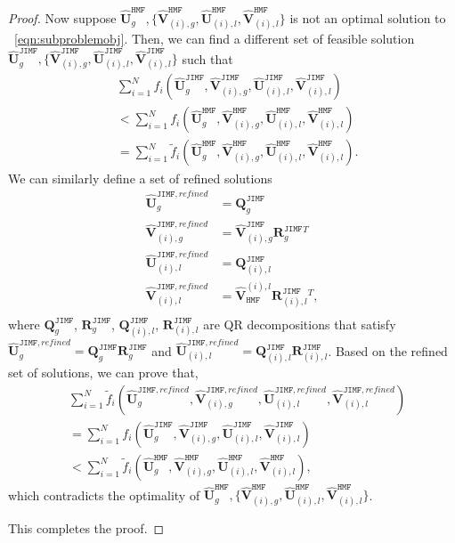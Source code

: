 \documentclass[10pt,a4paper]{amsart}
\newcommand{\hmatU}{\hat{\mathbf{U}}}
\newcommand{\hmatV}{\hat{\mathbf{V}}}
\def\hmf{\texttt{HMF}\xspace}
\def\inneralg{\texttt{JIMF}\xspace}
\newcommand{\matQ}{\mathbf{Q}}
\newcommand{\matR}{\mathbf{R}}
\newcommand{\tf}{\tilde{f}}
\begin{document}
\begin{proof}
Now suppose $\hmatU_g^{\hmf},\{\hmatV^{\hmf}_{(i),g},\hmatU^{\hmf}_{(i),l},\hmatV^{\hmf}_{(i),l}\}$ is not an optimal solution to ~\eqref{eqn:subproblemobj}. Then, we can find a different set of feasible solution $\hmatU_g^{\inneralg},\{\hmatV^{\inneralg}_{(i),g},\hmatU^{\inneralg}_{(i),l},\hmatV^{\inneralg}_{(i),l}\}$ such that
$$
\begin{aligned}
&\sum_{i=1}^N f_i\left(\hmatU^{\inneralg}_g,\hmatV^{\inneralg}_{(i),g},\hmatU^{\inneralg}_{(i),l},\hmatV^{\inneralg}_{(i),l}\right)\\
&< \sum_{i=1}^Nf_i\left(\hmatU^{\hmf}_g,\hmatV_{(i),g}^{\hmf},\hmatU^{\hmf}_{(i),l},\hmatV^{\hmf}_{(i),l}\right) \\
& = \sum_{i=1}^N\tf_i\left(\hmatU^{\hmf}_g,\hmatV_{(i),g}^{\hmf},\hmatU^{\hmf}_{(i),l},\hmatV^{\hmf}_{(i),l}\right).
\end{aligned}
$$
We can similarly define a set of refined solutions 
\begin{equation*}
\begin{aligned}
\hmatU_g^{\inneralg, refined} &= \matQ^{\inneralg}_g\\
\hmatV^{\inneralg, refined}_{(i),g} &= \hmatV_{(i),g}^{\inneralg} \matR_g^{\inneralg}{}^{T}\\
\hmatU^{\inneralg, refined}_{(i),l} &= \matQ^{\inneralg}_{(i),l}\\
\hmatV^{\inneralg, refined}_{(i),l} &= \hmatV^{(i),l}_{\hmf} \matR_{(i),l}^{\inneralg}{}^{T},\\
\end{aligned}
\end{equation*}
where $\matQ^{\inneralg}_g$, $\matR_g^{\inneralg}$, $\matQ^{\inneralg}_{(i),l}$, $\matR_{(i),l}^{\inneralg}$ are QR decompositions that satisfy $\hmatU_g^{\inneralg, refined}=\matQ^{\inneralg}_g\matR_g^{\inneralg}$ and $\hmatU^{\inneralg, refined}_{(i),l} =\matQ^{\inneralg}_{(i),l}\matR_{(i),l}^{\inneralg}$. Based on the refined set of solutions, we can prove that,
$$
\begin{aligned}
&\sum_{i=1}^N \tf_i\left(\hmatU^{\inneralg, refined}_g,\hmatV^{\inneralg, refined}_{(i),g},\hmatU^{\inneralg, refined}_{(i),l},\hmatV^{\inneralg, refined}_{(i),l}\right)\\
&=\sum_{i=1}^N f_i\left(\hmatU^{\inneralg}_g,\hmatV^{\inneralg}_{(i),g},\hmatU^{\inneralg}_{(i),l},\hmatV^{\inneralg}_{(i),l}\right)\\
& < \sum_{i=1}^N\tf_i\left(\hmatU^{\hmf}_g,\hmatV_{(i),g}^{\hmf},\hmatU^{\hmf}_{(i),l},\hmatV^{\hmf}_{(i),l}\right),
\end{aligned}
$$
which contradicts the optimality of $\hmatU_g^{\hmf},\{\hmatV^{\hmf}_{(i),g},\hmatU^{\hmf}_{(i),l},\hmatV^{\hmf}_{(i),l}\}$.

This completes the proof.
\end{proof}
\end{document}
